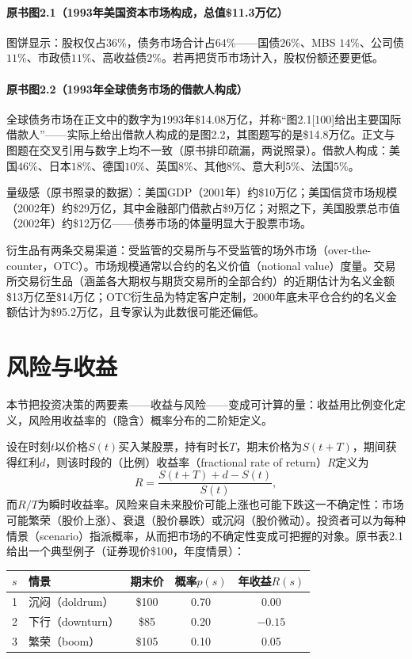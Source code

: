 \paragraph{原书图2.1（1993年美国资本市场构成，总值\$11.3万亿）}图饼显示：股权仅占$36\%$，债务市场合计占$64\%$——国债$26\%$、MBS $14\%$、公司债$11\%$、市政债$11\%$、高收益债$2\%$。若再把货币市场计入，股权份额还要更低。

\paragraph{原书图2.2（1993年全球债务市场的借款人构成）}全球债务市场在正文中的数字为1993年\$14.08万亿，并称“图2.1[100]给出主要国际借款人”——实际上给出借款人构成的是图2.2，其图题写的是\$14.8万亿。正文与图题在交叉引用与数字上均不一致（原书排印疏漏，两说照录）。借款人构成：美国$46\%$、日本$18\%$、德国$10\%$、英国$8\%$、其他$8\%$、意大利$5\%$、法国$5\%$。

量级感（原书照录的数据）：美国GDP（2001年）约\$10万亿；美国信贷市场规模（2002年）约\$29万亿，其中金融部门借款占\$9万亿；对照之下，美国股票总市值（2002年）约\$12万亿——债券市场的体量明显大于股票市场。

衍生品有两条交易渠道：受监管的交易所与不受监管的场外市场（over-the-counter，OTC）。市场规模通常以合约的名义价值（notional value）度量。交易所交易衍生品（涵盖各大期权与期货交易所的全部合约）的近期估计为名义金额\$13万亿至\$14万亿；OTC衍生品为特定客户定制，2000年底未平仓合约的名义金额估计为\$95.2万亿，且专家认为此数很可能还偏低。

\section{风险与收益}

本节把投资决策的两要素——收益与风险——变成可计算的量：收益用比例变化定义，风险用收益率的（隐含）概率分布的二阶矩定义。

设在时刻$t$以价格$S(t)$买入某股票，持有时长$T$，期末价格为$S(t+T)$，期间获得红利$d$，则该时段的（比例）收益率（fractional rate of return）$R$定义为
\begin{equation*}
R=\frac{S(t+T)+d-S(t)}{S(t)},
\end{equation*}
而$R/T$为瞬时收益率。风险来自未来股价可能上涨也可能下跌这一不确定性：市场可能繁荣（股价上涨）、衰退（股价暴跌）或沉闷（股价微动）。投资者可以为每种情景（scenario）指派概率，从而把市场的不确定性变成可把握的对象。原书表2.1给出一个典型例子（证券现价\$100，年度情景）：

\begin{center}
\begin{tabular}{llccc}
\hline
$s$ & 情景 & 期末价 & 概率$p(s)$ & 年收益$R(s)$\\
\hline
1 & 沉闷（doldrum） & \$100 & 0.70 & 0.00\\
2 & 下行（downturn） & \$85 & 0.20 & $-0.15$\\
3 & 繁荣（boom） & \$105 & 0.10 & 0.05\\
\hline
\end{tabular}
\end{center}

